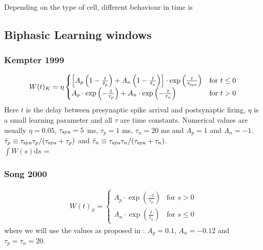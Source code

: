 Depending on the type of cell, different behaviour in time is 

\subsection{Biphasic Learning windows}

\subsubsection{Kempter 1999}
\begin{align}
W(t)_K = \eta
\begin{cases}
\left[A_{p}\left(1-\frac{t}{\tilde{\tau}_{p}}\right)+A_{n}\left(1-\frac{t}{\tilde{\tau}_{n}}\right)\right] \cdot \exp \left( \frac{t}{\tau_{\rm syn}} \right) & \text{for } t \leq 0 \\
A_{p} \cdot \exp \left(-\frac{t}{\tau_{p}}\right) + A_{n} \cdot \exp \left(-\frac{t}{\tau_{n}} \right) & \text{for } t > 0
\end{cases} \label{eq:learningwindowKempter1999}
\end{align}
Here $t$ is the delay between presynaptic spike arrival and postsynaptic firing, $\eta$ is a small learning parameter and all $\tau$ are time constants. Numerical values are usually  $\eta = 0.05$, $\tau_{\rm syn} = 5$ ms, $\tau_{p} = 1$ ms, $\tau_{n} = 20$ ms and $A_p = 1$ and $A_{n} = -1$. $\tilde{\tau}_{p} \equiv \tau_{\rm syn} \tau_{p} / (\tau_{\rm syn} + \tau_{p})$ and $\tilde{\tau}_{n} \equiv \tau_{\rm syn} \tau_{n} / (\tau_{\rm syn} + \tau_{n})$. \\
$\int W(s) \mathrm{d}s$ = 


\subsubsection{Song 2000}

\begin{align}
W(t)_S =
\begin{cases}
A_{p} \cdot \exp \left(\frac{-t}{\tau_p}\right) & \text{for } s > 0 \\
A_{n} \cdot \exp \left(\frac{t}{\tau_n}\right)  & \text{for } s \leq 0
\end{cases} \label{eq:learningwindowKempter1999}
\end{align}
where we will use the values as proposed in \cite{ChrolCannon2012}: $A_p = 0.1$, $A_n = -0.12$ and $\tau_p = \tau_n = 20$.

